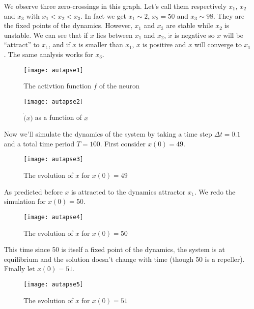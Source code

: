 We observe three zero-crossings in this graph. Let's call them respectively
$x_1$, $x_2$ and $x_3$ with $x_1 < x_2 < x_3$. In fact we get $x_1 \sim 2$,
$x_2 = 50$ and $x_3 \sim 98$. They are the fixed points of the dynamics.
However, $x_1$ and $x_3$ are stable while $x_2$ is unstable.
We can see that if $x$ lies between $x_1$ and $x_2$, $\dot{x}$ is negative
so $x$ will be ``attract'' to $x_1$, and if $x$ is smaller than $x_1$,
$\dot{x}$ is positive and $x$ will converge to $x_1$. The same analysis
works for $x_3$.

\newpage

\vspace{-1em}
\begin{figure}[H]
  \centering
  \texttt{[image: autapse1]}
  \caption{The activtion function $f$ of the neuron}
  \label{fig: activate}
\end{figure}

\vspace{-1em}
\begin{figure}[H]
  \centering
  \texttt{[image: autapse2]}
  \caption{$\dot(x)$ as a function of $x$}
  \label{fig: x_derivative}
\end{figure}

Now we'll simulate the dynamics of the system by taking a time step 
$\Delta t = 0.1$ and a total time period $T = 100$. First consider
$x(0) = 49$.

\vspace{-1em}
\begin{figure}[H]
  \centering
  \texttt{[image: autapse3]}
  \caption{The evolution of $x$ for $x(0) = 49$}
\end{figure}

\noindent
As predicted before $x$ is attracted to the dynamics attractor $x_1$.
We redo the simulation for $x(0) = 50$.

\vspace{-1em}
\begin{figure}[H]
  \centering
  \texttt{[image: autapse4]}
  \caption{The evolution of $x$ for $x(0) = 50$}
\end{figure}

\noindent
This time since 50 is itself a fixed point of the dynamics, the system 
is at equilibrium and the solution doesn't change with time (though 50
is a repeller). Finally let $x(0) = 51$.

\vspace{-1em}
\begin{figure}[H]
  \centering
  \texttt{[image: autapse5]}
  \caption{The evolution of $x$ for $x(0) = 51$}
\end{figure}

